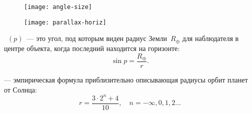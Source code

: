 \vspace{-1.5pc}
\begin{figure}[h!]
	\begin{minipage}[b]{0.5\tw}
		\begin{flushleft}
			\texttt{[image: angle-size]}
		\end{flushleft}
	\end{minipage}
	\begin{minipage}[b]{0.5\tw}
		\centering
		\texttt{[image: parallax-horiz]}
	\end{minipage}
\end{figure}

~$(p)$~--- это угол, под которым виден радиус Земли~$R_\oplus$ для наблюдателя в центре объекта, когда последний находится на горизонте:
\begin{equation}
\sin p=\frac{R_\oplus}{r}.
\end{equation}

 --- эмпирическая формула приблизительно описывающая 
радиусы орбит планет от Солнца:
\begin{equation}r=\frac{3\cdot 2^n+4}{10}, \quad n=-\infty, 0, 1, 2...
\end{equation}

